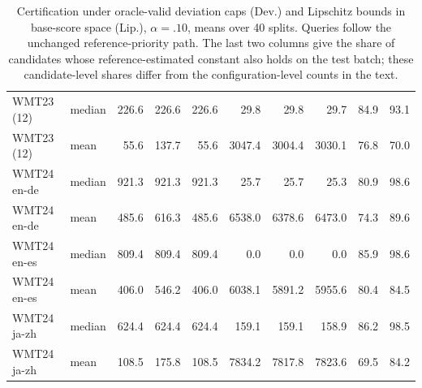 \begin{table}[t]
\begin{tabular}{@{}llrrrrrrrr@{}}
WMT23 (12) & median & 226.6 & 226.6 & 226.6 & 29.8 & 29.8 & 29.7 & 84.9 & 93.1\\
WMT23 (12) & mean & 55.6 & 137.7 & 55.6 & 3047.4 & 3004.4 & 3030.1 & 76.8 & 70.0\\
WMT24 en-de & median & 921.3 & 921.3 & 921.3 & 25.7 & 25.7 & 25.3 & 80.9 & 98.6\\
WMT24 en-de & mean & 485.6 & 616.3 & 485.6 & 6538.0 & 6378.6 & 6473.0 & 74.3 & 89.6\\
WMT24 en-es & median & 809.4 & 809.4 & 809.4 & 0.0 & 0.0 & 0.0 & 85.9 & 98.6\\
WMT24 en-es & mean & 406.0 & 546.2 & 406.0 & 6038.1 & 5891.2 & 5955.6 & 80.4 & 84.5\\
WMT24 ja-zh & median & 624.4 & 624.4 & 624.4 & 159.1 & 159.1 & 158.9 & 86.2 & 98.5\\
WMT24 ja-zh & mean & 108.5 & 175.8 & 108.5 & 7834.2 & 7817.8 & 7823.6 & 69.5 & 84.2\\
\bottomrule
\end{tabular}
\caption{Certification under oracle-valid deviation caps (Dev.) and Lipschitz bounds in base-score space (Lip.), $\alpha=.10$, means over 40 splits. Queries follow the unchanged reference-priority path. The last two columns give the share of candidates whose reference-estimated constant also holds on the test batch; these candidate-level shares differ from the configuration-level counts in the text.}
\label{tab:constrained}
\end{table}

